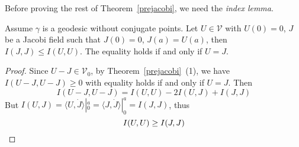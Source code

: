 Before proving the rest of Theorem~\ref{prejacobi}, we need the \emph{index lemma}.
\begin{prop}
    Assume $\gamma$ is a geodesic without conjugate points.
    Let $U\in\mathscr{V}$ with $U(0)=0$, $J$ be a Jacobi field such that $J(0)=0$, $J(a)=U(a)$, then $I(J,J)\leq I(U,U)$.
    The equality holds if and only if $U=J$.
\end{prop}
\begin{proof}
    Since $U-J\in\mathscr{V}_0$, by Theorem~\ref{prejacobi}~(1), we have $I(U-J,U-J)\geq 0$ with equality holds if and only if $U=J$. Then
    \[I(U-J,U-J)=I(U,U)-2I(U,J)+I(J,J)\]
    But $I(U,J)=\langle U,\dot{J}\rangle|_0^a=\langle J,\dot{J}\rangle|_0^a=I(J,J)$, thus
    \[I(U,U)\geq I(J,J)\qedhere\]
\end{proof}

